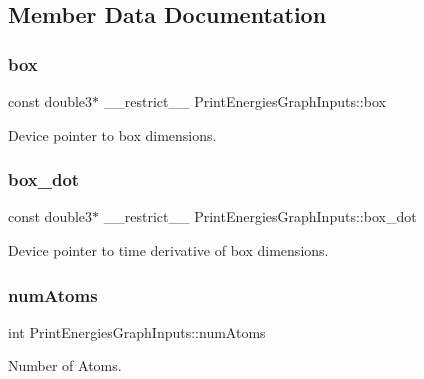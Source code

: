 \subsection{Member Data Documentation}
\hypertarget{structPrintEnergiesGraphInputs_a1e348a5a2a281ba456f7fa8955b43c02}{}\label{structPrintEnergiesGraphInputs_a1e348a5a2a281ba456f7fa8955b43c02} 
\subsubsection{\texorpdfstring{box}{box}}
{\footnotesize\ttfamily const double3$\ast$ \+\_\+\+\_\+restrict\+\_\+\+\_\+ Print\+Energies\+Graph\+Inputs\+::box}



Device pointer to box dimensions. 

\hypertarget{structPrintEnergiesGraphInputs_a19e4bdc53ef87010bb737cb6860ec653}{}\label{structPrintEnergiesGraphInputs_a19e4bdc53ef87010bb737cb6860ec653} 
\subsubsection{\texorpdfstring{box\+\_\+dot}{box\_dot}}
{\footnotesize\ttfamily const double3$\ast$ \+\_\+\+\_\+restrict\+\_\+\+\_\+ Print\+Energies\+Graph\+Inputs\+::box\+\_\+dot}



Device pointer to time derivative of box dimensions. 

\hypertarget{structPrintEnergiesGraphInputs_a959260c65f04a41a113f62ef76504966}{}\label{structPrintEnergiesGraphInputs_a959260c65f04a41a113f62ef76504966} 
\subsubsection{\texorpdfstring{num\+Atoms}{numAtoms}}
{\footnotesize\ttfamily int Print\+Energies\+Graph\+Inputs\+::num\+Atoms}



Number of Atoms. 

